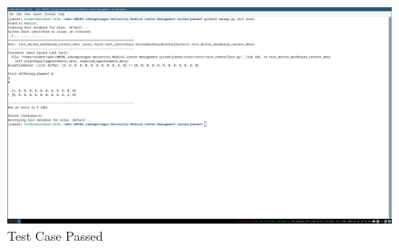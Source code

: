 \documentclass[a4paper,12pt]{article}
\begin{document}
\begin{figure}[H]
    \centering
    \includegraphics[width=1\textwidth]{images/test1.png}
    \caption{Test Case Passed}
    \label{fig:testcreateaccount}
\end{figure}
\end{document}
